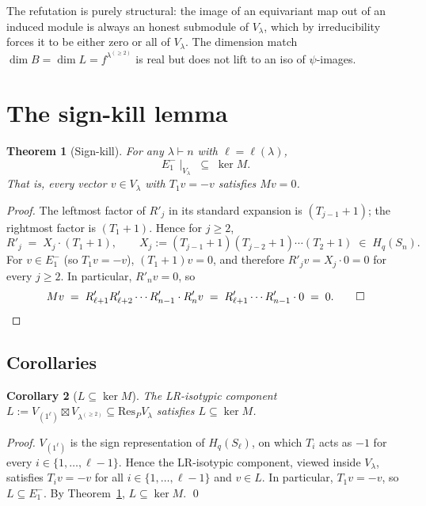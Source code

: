 \documentclass[11pt]{article}
\newtheorem{theorem}{Theorem}
\newtheorem{corollary}[theorem]{Corollary}
\theoremstyle{definition}
\begin{document}
The refutation is purely structural: the image of an equivariant map
out of an induced module is always an honest submodule of $V_\lambda$,
which by irreducibility forces it to be either zero or all of
$V_\lambda$. The dimension match $\dim B = \dim L = f^{\lambda^{(\ge 2)}}$
is real but does not lift to an iso of $\psi$-images.

\section{The sign-kill lemma}\label{sec:sign-kill}

\begin{theorem}[Sign-kill]\label{thm:sign-kill-body}
For any $\lambda \vdash n$ with $\ell = \ell(\lambda)$,
\[
   E_1^-\!\mid_{V_\lambda} \;\subseteq\; \ker M.
\]
That is, every vector $v \in V_\lambda$ with $T_1 v = -v$ satisfies
$M v = 0$.
\end{theorem}

\begin{proof}
The leftmost factor of $R'_j$ in its standard expansion is $(T_{j-1}+1)$;
the rightmost factor is $(T_1 + 1)$. Hence for $j \ge 2$,
\[
   R'_j \;=\; X_j \cdot (T_1 + 1), \qquad
   X_j := (T_{j-1}+1)(T_{j-2}+1)\cdots(T_2+1) \;\in\; H_q(S_n).
\]
For $v \in E_1^-$ (so $T_1 v = -v$), $(T_1 + 1) v = 0$, and therefore
$R'_j v = X_j \cdot 0 = 0$ for every $j \ge 2$. In particular,
$R'_n v = 0$, so
\[
   M v \;=\; R'_{\ell+1} R'_{\ell+2} \cdots R'_{n-1} \cdot R'_n v
        \;=\; R'_{\ell+1} \cdots R'_{n-1} \cdot 0 \;=\; 0. \qed
\]
\end{proof}

\subsection{Corollaries}

\begin{corollary}[$L \subseteq \ker M$]\label{cor:L-in-ker}
The LR-isotypic component
$L := V_{(1^\ell)} \boxtimes V_{\lambda^{(\ge 2)}} \subseteq
\mathrm{Res}_P V_\lambda$ satisfies $L \subseteq \ker M$.
\end{corollary}

\begin{proof}
$V_{(1^\ell)}$ is the sign representation of $H_q(S_\ell)$, on which
$T_i$ acts as $-1$ for every $i \in \{1, \ldots, \ell - 1\}$. Hence
the LR-isotypic component, viewed inside $V_\lambda$, satisfies
$T_i v = -v$ for all $i \in \{1, \ldots, \ell - 1\}$ and $v \in L$.
In particular, $T_1 v = -v$, so $L \subseteq E_1^-$. By
Theorem~\ref{thm:sign-kill-body}, $L \subseteq \ker M$. \qed
\end{proof}
\end{document}
